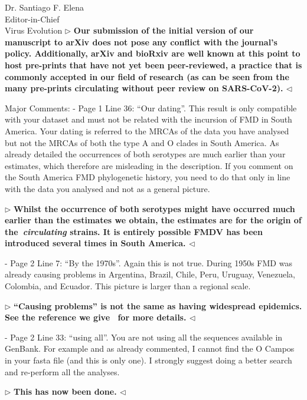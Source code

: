 \documentclass[12pt, a4paper]{letter} %
\newenvironment{reply}{$\triangleright$\bf}{$\triangleleft$}
\begin{document}
\begin{letter}{
	Dr. Santiago F. Elena\\
    Editor-in-Chief \\
    Virus Evolution
}
\begin{reply}
Our submission of the initial version of our manuscript to arXiv does not pose any conflict with the journal's policy.
Additionally, arXiv and bioRxiv are well known at this point to host pre-prints that have not yet been peer-reviewed, a practice that is commonly accepted in our field of research (as can be seen from the many pre-prints circulating without peer review on SARS-CoV-2).
\end{reply}

Major Comments:
-       Page 1 Line 36: ``Our dating''. 
This result is only compatible with your dataset and must not be related with the incursion of FMD in South America. 
Your dating is referred to the MRCAs of the data you have analysed but not the MRCAs of both the type A and O clades in South America. 
As already detailed the occurrences of both serotypes are much earlier than your estimates, which therefore are misleading in the description. 
If you comment on the South America FMD phylogenetic history, you need to do that only in line with the data you analysed and not as a general picture.

\begin{reply}
Whilst the occurrence of both serotypes might have occurred much earlier than the estimates we obtain, the estimates are for the origin of the~\textit{circulating} strains.
It is entirely possible FMDV has been introduced several times in South America.
\end{reply}

-       Page 2 Line 7: ``By the 1970s''. 
Again this is not true. 
During 1950s FMD was already causing problems in Argentina, Brazil, Chile, Peru, Uruguay, Venezuela, Colombia, and Ecuador. 
This picture is larger than a regional scale.

\begin{reply}
``Causing problems'' is not the same as having widespread epidemics.
See the reference we give~\citep{Saraiva2003} for more details.
\end{reply}

-       Page 2 Line 33: ``using all''. 
You are not using all the sequences available in GenBank. 
For example and as already commented, I cannot find the O Campos in your fasta file (and this is only one). 
I strongly suggest doing a better search and re-perform all the analyses.

\begin{reply}
This has now been done.
\end{reply}


\end{letter}
\end{document}
